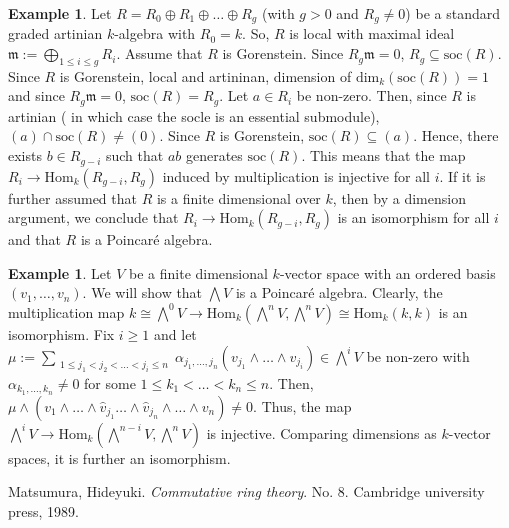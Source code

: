 \documentclass[oneside,11pt,reqno]{amsart}
\theoremstyle{definition}
\newtheorem{ex}[thm]{Example}
\theoremstyle{remark}
\begin{document}
\begin{ex}
	Let $R=R_{0} \oplus R_{1} \oplus \ldots  \oplus R_{g}$ (with $g>0$ and $R_{g}\neq 0$) be a standard graded artinian $k$-algebra with $R_{0}=k$. So, $R$ is local with maximal ideal $\mathfrak{m}:=\bigoplus_{1\leqslant i \leqslant  g} R_{i}$. Assume that $R$ is Gorenstein. Since $R_{g}\mathfrak{m} =0$, $R_{g}\subseteq \text{soc}(R)$. { Since $R$ is Gorenstein, local and artininan, dimension of $\text{dim}_{k}(\text{soc}(R))=1$} and since $R_{g}\mathfrak{m}=0$, $\text{soc}(R)=R_{g}$. Let $a\in R_{i}$ be non-zero. Then, since $R$ is artinian ({\color{Sepia} in which case the socle is an essential submodule}), $(a)\cap \text{soc}(R)\neq (0)$. Since $R$ is Gorenstein, $\text{soc}(R)\subseteq (a)$. Hence, there exists $b\in R_{g-i}$ such that $ab$ generates $\text{soc}(R) $. This means that the map $R_{i}\rightarrow \text{Hom}_{k}(R_{g-i},R_{g})$ induced by multiplication is injective for all $i$. If it is further assumed that $R$ is a finite dimensional over $k$, then by a dimension argument, we conclude that $R_{i}\rightarrow \text{Hom}_{k}(R_{g-i},R_{g})$ is an isomorphism for all $i$ and that $R$ is a Poincar\'{e} algebra.  
\end{ex}

\begin{ex}
	Let $V$ be a finite dimensional $k$-vector space with an ordered basis $( v_{1},\ldots ,v_{n} )$. We will show that $\bigwedge V$ is a Poincar\'{e} algebra. Clearly, the multiplication map $k \cong \bigwedge ^{0} V \rightarrow \text{Hom}_{k}(\bigwedge ^{n} V , \bigwedge ^{n } V) \cong \text{Hom}_{k}(k,k)$ is an isomorphism. Fix $i \geqslant 1$ and let $\mu :=\sum_{\substack{1\leqslant j_{1}<j_{2}<\ldots <j_{i}\leqslant n}}^{} \alpha _{j_{1},\ldots ,j_{n}} (v_{j_{1}} \wedge \ldots \wedge v_{j_{i}})\in \bigwedge^{i}V$ be non-zero with $\alpha _{k_{1},\ldots ,k_{n}}\neq 0$ for some $1\leqslant k_{1}<\ldots <k_{n}\leqslant n$. Then, $\mu \wedge (v_{1}\wedge \ldots \wedge \hat v_{j_{1}}\ldots \wedge \hat v_{j_{n}}\wedge \ldots  \wedge v_{n}) \neq 0$. Thus, the map $\bigwedge ^{i} V \rightarrow \text{Hom}_{k}(\bigwedge ^{n-i} V, \bigwedge^{n} V)$ is injective. Comparing dimensions as $k$-vector spaces, it is further an isomorphism.
\end{ex}







\begin{thebibliography}{Neil1234}
	
 Matsumura, Hideyuki. \emph{Commutative ring theory}. No. 8. Cambridge university press, 1989.
\end{thebibliography}
\end{document}
